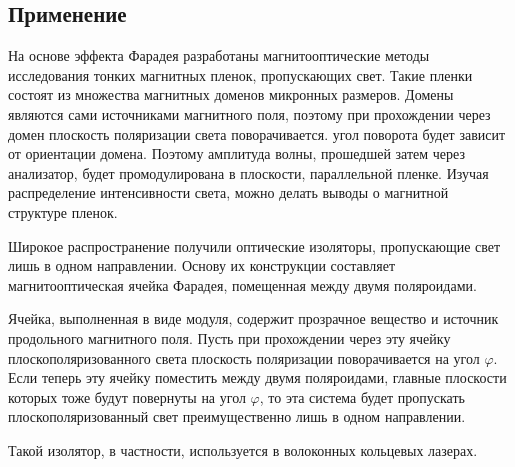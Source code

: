 \documentclass[12pt,a4paper]{article}
\begin{document}
\subsection*{Применение}
На основе эффекта Фарадея разработаны магнитооптические методы исследования тонких магнитных пленок, пропускающих свет. Такие пленки состоят из множества магнитных доменов микронных размеров. Домены являются сами источниками магнитного поля, поэтому при прохождении через домен плоскость поляризации света поворачивается. угол поворота будет зависит от ориентации домена. Поэтому амплитуда волны, прошедшей затем через анализатор, будет промодулирована в плоскости, параллельной пленке. Изучая распределение интенсивности света, можно делать выводы о магнитной структуре пленок.

Широкое распространение получили оптические изоляторы, пропускающие свет лишь в одном направлении. Основу их конструкции составляет магнитооптическая ячейка Фарадея, помещенная между двумя поляроидами.

Ячейка, выполненная в виде модуля, содержит прозрачное вещество и источник продольного магнитного поля. Пусть при прохождении через эту ячейку плоскополяризованного света плоскость поляризации поворачивается на угол $\varphi$. Если теперь эту ячейку поместить между двумя поляроидами, главные плоскости которых тоже будут повернуты на угол $\varphi$, то эта система будет пропускать плоскополяризованный свет преимущественно лишь в одном направлении.

Такой изолятор, в частности, используется в волоконных кольцевых лазерах.
\end{document}
